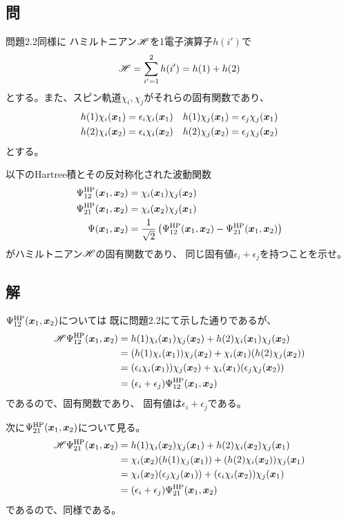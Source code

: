 \subsection{問}
問題2.2同様に
ハミルトニアン${\mathscr{H}}$を1電子演算子$h(i')$で
\begin{align}
	{\ensuremath{\mathscr{H}}}
=
	\sum_{i'=1}^{2} h(i')
=
	h(1)
	+
	h(2)
\end{align}
とする。また、スピン軌道$\chi_i,\chi_j$がそれらの固有関数であり、
\begin{align}
	h(1) \chi_i(\x_1)
&=
	\epsilon_i \chi_i(\x_1) &
%
%
	h(1) \chi_j(\x_1)
&=
	\epsilon_j \chi_j(\x_1) \\
%
%
	h(2) \chi_i(\x_2)
&=
	\epsilon_i \chi_i(\x_2) &
%
%
	h(2) \chi_j(\x_2)
&=
	\epsilon_j \chi_j(\x_2)
\end{align}
とする。

以下のHartree積とその反対称化された波動関数
\begin{align}
	\Psi^{\rm HP}_{12}(\x_1,\x_2)
&=
	\chi_i(\x_1) \chi_j(\x_2) \\
%
%
	\Psi^{\rm HP}_{21}(\x_1,\x_2)
&=
	\chi_i(\x_2) \chi_j(\x_1) \\
%
%
	\Psi(\x_1,\x_2)
&=
	\frac{1}{\sqrt{2}}
		\left(
			\Psi^{\rm HP}_{12}(\x_1,\x_2)
			-
			\Psi^{\rm HP}_{21}(\x_1,\x_2)
		\right)
\end{align}
がハミルトニアン${\mathscr{H}}$の固有関数であり、
同じ固有値$\epsilon_i+\epsilon_j$を持つことを示せ。


\subsection{解}
$\Psi^{\rm HP}_{12}({\bm{x}}_1,{\bm{x}}_2)$については
既に問題2.2にて示した通りであるが、
\begin{align}
	\H \Psi^{\rm HP}_{12}(\x_1,\x_2)
&=
	h(1) \chi_i(\x_1) \chi_j(\x_2)
	+
	h(2) \chi_i(\x_1) \chi_j(\x_2) \\
%
%
&=
	(h(1) \chi_i(\x_1)) \chi_j(\x_2)
	+
	\chi_i(\x_1) (h(2) \chi_j(\x_2)) \\
%
%
&=
	(\epsilon_i \chi_i(\x_1)) \chi_j(\x_2)
	+
	\chi_i(\x_1) (\epsilon_j \chi_j(\x_2)) \\
%
%
&=
	(\epsilon_i+\epsilon_j) \Psi^{\rm HP}_{12}(\x_1,\x_2)
\end{align}
であるので、固有関数であり、
固有値は$\epsilon_i+\epsilon_j$である。

次に$\Psi^{\rm HP}_{21}({\bm{x}}_1,{\bm{x}}_2)$について見る。
\begin{align}
	\H\Psi^{\rm HP}_{21}(\x_1,\x_2)
&=
	h(1) \chi_i(\x_2) \chi_j(\x_1)
	+
	h(2) \chi_i(\x_2) \chi_j(\x_1) \\
%
%
&=
	\chi_i(\x_2) (h(1) \chi_j(\x_1))
	+
	(h(2) \chi_i(\x_2)) \chi_j(\x_1) \\
%
%
&=
	\chi_i(\x_2) (\epsilon_j \chi_j(\x_1))
	+
	(\epsilon_i \chi_i(\x_2)) \chi_j(\x_1) \\
%
%
&=
	(\epsilon_i+\epsilon_j) \Psi^{\rm HP}_{21}(\x_1,\x_2)
\end{align}
であるので、同様である。

